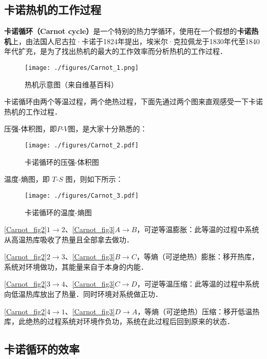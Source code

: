 
\subsection{卡诺热机的工作过程}
\textbf{卡诺循环（Carnot cycle）}是一个特别的热力学循环，使用在一个假想的\textbf{卡诺热机}上，由法国人尼古拉·卡诺于1824年提出，埃米尔·克拉佩龙于1830年代至1840年代扩充，是为了找出热机的最大的工作效率而分析热机的工作过程．

\begin{figure}[ht]
\centering
\texttt{[image: ./figures/Carnot\_1.png]}
\caption{热机示意图（来自维基百科）} \label{Carnot_fig1}
\end{figure}
卡诺循环由两个等温过程，两个绝热过程，下面先通过两个图来直观感受一下卡诺热机的工作过程．

压强-体积图，即$P$-$V$图，是大家十分熟悉的：
\begin{figure}[ht]
\centering
\texttt{[image: ./figures/Carnot\_2.pdf]}
\caption{卡诺循环的压强-体积图} \label{Carnot_fig2}
\end{figure}
温度-熵图，即 $T$-$S$ 图，则如下所示：
\begin{figure}[ht]
\centering
\texttt{[image: ./figures/Carnot\_3.pdf]}
\caption{卡诺循环的温度-熵图} \label{Carnot_fig3}
\end{figure}

\autoref{Carnot_fig2}$1\to 2$、\autoref{Carnot_fig3}$A\to B$，可逆等温膨胀：此等温的过程中系统从高温热库吸收了热量且全部拿去做功．

\autoref{Carnot_fig2}$2\to 3$、\autoref{Carnot_fig3}$B\to C$，等熵（可逆绝热）膨胀：移开热库，系统对环境做功，其能量来自于本身的内能．

\autoref{Carnot_fig2}$3\to 4$、\autoref{Carnot_fig3}$C\to D$，可逆等温压缩：此等温的过程中系统向低温热库放出了热量．同时环境对系统做正功．

\autoref{Carnot_fig2}$4\to 1$、\autoref{Carnot_fig3}$D\to A$，等熵（可逆绝热）压缩：移开低温热库，此绝热的过程系统对环境作负功，系统在此过程后回到原来的状态．

\subsection{卡诺循环的效率}

